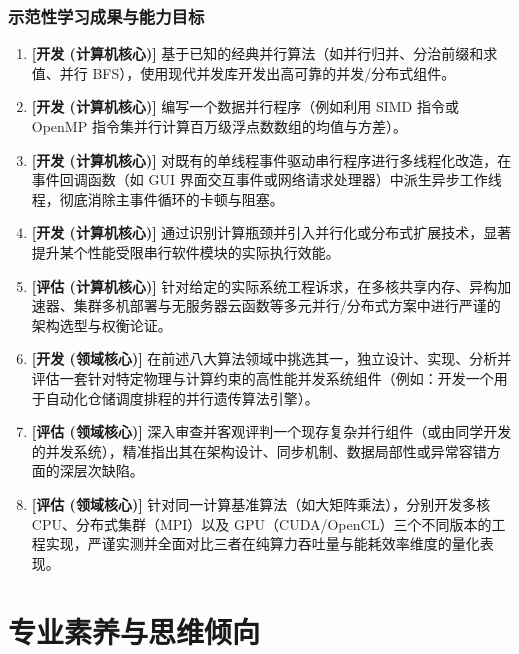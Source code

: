 \subsubsection{示范性学习成果与能力目标}
\begin{enumerate}
    \item \textbf{[开发 (计算机核心)]} 基于已知的经典并行算法（如并行归并、分治前缀和求值、并行 BFS），使用现代并发库开发出高可靠的并发/分布式组件。
    \item \textbf{[开发 (计算机核心)]} 编写一个数据并行程序（例如利用 SIMD 指令或 OpenMP 指令集并行计算百万级浮点数数组的均值与方差）。
    \item \textbf{[开发 (计算机核心)]} 对既有的单线程事件驱动串行程序进行多线程化改造，在事件回调函数（如 GUI 界面交互事件或网络请求处理器）中派生异步工作线程，彻底消除主事件循环的卡顿与阻塞。
    \item \textbf{[开发 (计算机核心)]} 通过识别计算瓶颈并引入并行化或分布式扩展技术，显著提升某个性能受限串行软件模块的实际执行效能。
    \item \textbf{[评估 (计算机核心)]} 针对给定的实际系统工程诉求，在多核共享内存、异构加速器、集群多机部署与无服务器云函数等多元并行/分布式方案中进行严谨的架构选型与权衡论证。
    \item \textbf{[开发 (领域核心)]} 在前述八大算法领域中挑选其一，独立设计、实现、分析并评估一套针对特定物理与计算约束的高性能并发系统组件（例如：开发一个用于自动化仓储调度排程的并行遗传算法引擎）。
    \item \textbf{[评估 (领域核心)]} 深入审查并客观评判一个现存复杂并行组件（或由同学开发的并发系统），精准指出其在架构设计、同步机制、数据局部性或异常容错方面的深层次缺陷。
    \item \textbf{[评估 (领域核心)]} 针对同一计算基准算法（如大矩阵乘法），分别开发多核 CPU、分布式集群（MPI）以及 GPU（CUDA/OpenCL）三个不同版本的工程实现，严谨实测并全面对比三者在纯算力吞吐量与能耗效率维度的量化表现。
\end{enumerate}

\section{专业素养与思维倾向}

